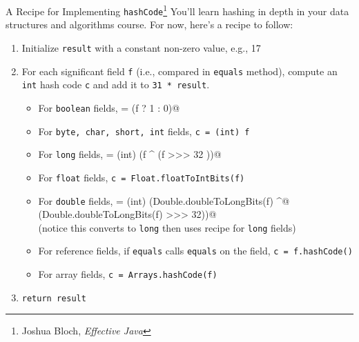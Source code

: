 \documentclass{beamer}
\begin{document}
\begin{frame}[fragile]{A Recipe for Implementing {\tt hashCode}\footnote{Joshua Bloch, {\it Effective Java}}}
\vspace{-.05in}
You'll learn hashing in depth in your data structures and algorithms course.  For now, here's a recipe to follow:

\begin{enumerate}
\item Initialize {\tt result} with a constant non-zero value, e.g., 17
\item For each significant field {\tt f} (i.e., compared in {\tt equals} method), compute an {\tt int} hash code {\tt c} and add it to {\tt 31 * result}.
\begin{itemize}
\item For {\tt boolean} fields, \verb@c = (f ? 1 : 0)@
\item For {\tt byte, char, short, int} fields, {\tt c = (int) f}
\item For {\tt long} fields, \verb@c = (int) (f ^ (f >>> 32 ))@
\item For {\tt float} fields, {\tt c = Float.floatToIntBits(f)}
\item For {\tt double} fields, \verb@c = (int) (Double.doubleToLongBits(f) ^@ \\ \verb@    (Double.doubleToLongBits(f) >>> 32))@ \\ (notice this converts to {\tt long} then uses recipe for {\tt long} fields)
\item For reference fields, if {\tt equals} calls {\tt equals} on the field, {\tt c = f.hashCode()}
\item For array fields, {\tt c = Arrays.hashCode(f)}
\end{itemize}
\item {\tt return result}
\end{enumerate}

\end{frame}
\end{document}
